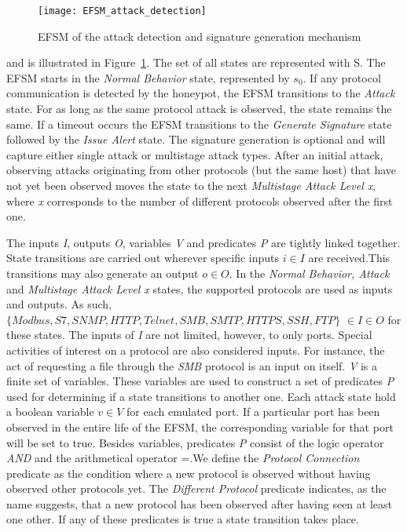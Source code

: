 \documentclass[article,msc=informatik,type=msc,colorback,accentcolor=tud9c]{tudthesis}
\begin{document}
 
 
 	\begin{figure}[ht]
        \centering
        \texttt{[image: EFSM\_attack\_detection]}
        \caption[EFSM of the attack detection and signature generation mechanism.]{\label{f:EFSM}EFSM of the attack detection and signature generation mechanism}
        \cite{1234567}
        \end{figure}
        
        
	and is illustrated in Figure~\ref{f:EFSM}. The set of all states are represented with S. The \ac{EFSM} starts in the \textit{Normal Behavior} state, represented by $s_0 $. If any protocol communication is detected by the honeypot, the \ac{EFSM} transitions to the \textit{Attack} state. For as long as the same protocol attack is observed, the state remains the same. If a timeout occurs the \ac{EFSM} transitions to the \textit{Generate Signature} state followed by the \textit{Issue Alert} state. The signature generation is optional and will capture either single attack or multistage attack types. After an initial attack, observing attacks originating from other protocols (but the same host) that have not yet been observed moves the state to the next \textit{Multistage Attack Level x}, where \textit{x} corresponds to the number of different protocols observed after the first one.

	\vspace{3mm}
	The inputs \textit{I}, outputs \textit{O}, variables \textit{V} and predicates \textit{P} are tightly linked together. State transitions are carried out wherever specific inputs $i	\in I$ are received.This transitions may also generate an output $o \in O$. In the \textit{Normal Behavior, Attack} and \textit{Multistage Attack Level x} states, the supported protocols are used as inputs and outputs. As such, $\{Modbus,S7, SNMP, HTTP, Telnet, SMB, SMTP, HTTPS, SSH, FTP\}$ $\in I \in O$ for these states. The inputs of \textit{I} are not limited, however, to only ports. Special activities of interest on a protocol are also considered inputs.  For instance, the act of requesting a file through the \textit{SMB} protocol is an input on itself. \textit{V} is a finite set of variables. These variables are used to construct a set of predicates \textit{P} used for determining if a state transitions to another one. Each attack state hold a boolean variable $v \in V$ for each emulated port. If a particular port has been observed in the entire life of the \ac{EFSM}, the corresponding variable for that port will be set to true. Besides variables, predicates \textit{P} consist of the logic operator \textit{AND} and the arithmetical operator =.We define the \textit{Protocol Connection} predicate as the condition where a new protocol is observed without having observed other protocols yet. The \textit{Different Protocol} predicate indicates, as the name suggests, that a new protocol has been observed after having seen at least one other. If any of these predicates is true a state transition takes place.
\end{document}
